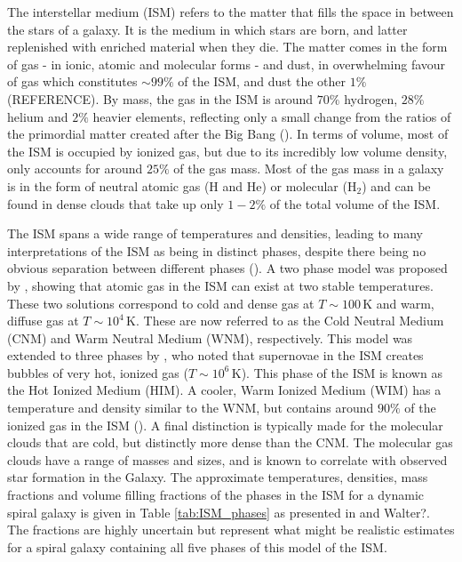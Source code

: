 The interstellar medium (ISM) refers to the matter that fills the space in between the stars of a galaxy. It is the medium in which stars are born, and latter replenished with enriched material when they die. The matter comes in the form of gas - in ionic, atomic and molecular forms - and dust, in overwhelming favour of gas which constitutes $\sim99\%$ of the ISM, and dust the other $1\%$ ({\color{red}REFERENCE}). By mass, the gas in the ISM is around $70\%$ hydrogen, $28\%$ helium and $2\%$ heavier elements, reflecting only a small change from the ratios of the primordial matter created after the Big Bang (\citealt{Klessen_2016}). In terms of volume, most of the ISM is occupied by ionized gas, but due to its incredibly low volume density, only accounts for around $25\%$ of the gas mass. Most of the gas mass in a galaxy is in the form of neutral atomic gas (H and He) or molecular (H$_2$) and can be found in dense clouds that take up only $1-2\%$ of the total volume of the ISM.

The ISM spans a wide range of temperatures and densities, leading to many interpretations of the ISM as being in distinct phases, despite there being no obvious separation between different phases (\citealt{Cox_2005}). A two phase model was proposed by \citealt{Field_1969}, showing that atomic gas in the ISM can exist at two stable temperatures. These two solutions correspond to cold and dense gas at $T\sim100\,$K and warm, diffuse gas at $T\sim10^4\,$K. These are now referred to as the Cold Neutral Medium (CNM) and Warm Neutral Medium (WNM), respectively. This model was extended to three phases by \citealt{McKee_1977}, who noted that supernovae in the ISM creates bubbles of very hot, ionized gas ($T\sim10^6\,$K). This phase of the ISM is known as the Hot Ionized Medium (HIM). A cooler, Warm Ionized Medium (WIM) has a temperature and density similar to the WNM, but contains around $90\%$ of the ionized gas in the ISM (\citealt{Haffner_2009}). A final distinction is typically made for the molecular clouds that are cold, but distinctly more dense than the CNM. The molecular gas clouds have a range of masses and sizes, and is known to correlate with observed star formation in the Galaxy. The approximate temperatures, densities, mass fractions and volume filling fractions of the phases in the ISM for a dynamic spiral galaxy is given in Table \ref{tab:ISM_phases} as presented in \citealt{Ferriere_2001} and {\color{red}Walter?}. The fractions are highly uncertain but represent what might be realistic estimates for a spiral galaxy containing all five phases of this model of the ISM.

